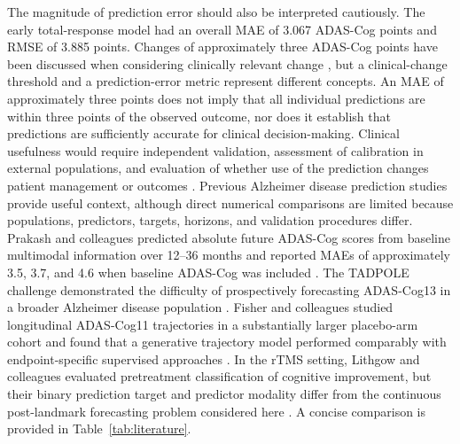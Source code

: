 \documentclass[11pt]{article}
\begin{document}
The magnitude of prediction error should also be interpreted cautiously. The early total-response model had an overall MAE of 3.067 ADAS-Cog points and RMSE of 3.885 points. Changes of approximately three ADAS-Cog points have been discussed when considering clinically relevant change \citep{schrag2012clinically}, but a clinical-change threshold and a prediction-error metric represent different concepts. An MAE of approximately three points does not imply that all individual predictions are within three points of the observed outcome, nor does it establish that predictions are sufficiently accurate for clinical decision-making. Clinical usefulness would require independent validation, assessment of calibration in external populations, and evaluation of whether use of the prediction changes patient management or outcomes \citep{vancalster2019calibration,ramspek2021external}. Previous Alzheimer disease prediction studies provide useful context, although direct numerical comparisons are limited because populations, predictors, targets, horizons, and validation procedures differ. Prakash and colleagues predicted absolute future ADAS-Cog scores from baseline multimodal information over 12--36 months and reported MAEs of approximately 3.5, 3.7, and 4.6 when baseline ADAS-Cog was included \citep{prakash2021quantitative}. The TADPOLE challenge demonstrated the difficulty of prospectively forecasting ADAS-Cog13 in a broader Alzheimer disease population \citep{marinescu2021tadpole}. Fisher and colleagues studied longitudinal ADAS-Cog11 trajectories in a substantially larger placebo-arm cohort and found that a generative trajectory model performed comparably with endpoint-specific supervised approaches \citep{fisher2019forecasting}. In the rTMS setting, Lithgow and colleagues evaluated pretreatment classification of cognitive improvement, but their binary prediction target and predictor modality differ from the continuous post-landmark forecasting problem considered here \citep{lithgow2022baseline}. A concise comparison is provided in Table~\ref{tab:literature}.
\end{document}

